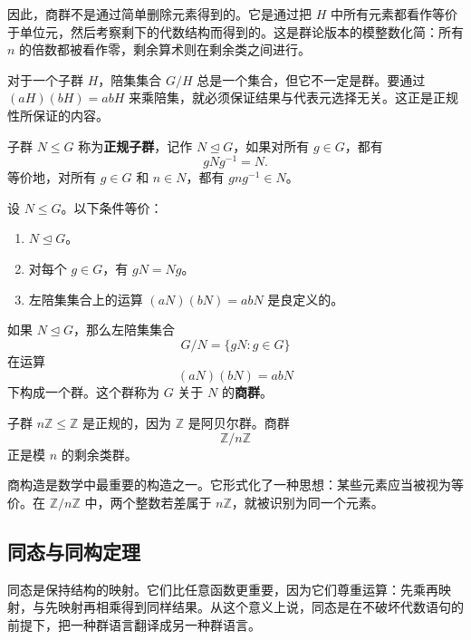 因此，商群不是通过简单删除元素得到的。它是通过把 $H$ 中所有元素都看作等价于单位元，然后考察剩下的代数结构而得到的。这是群论版本的模整数化简：所有 $n$ 的倍数都被看作零，剩余算术则在剩余类之间进行。

对于一个子群 $H$，陪集集合 $G/H$ 总是一个集合，但它不一定是群。要通过 $(aH)(bH)=abH$ 来乘陪集，就必须保证结果与代表元选择无关。这正是正规性所保证的内容。

\begin{definition}[正规子群]
子群 $N\leq G$ 称为\textbf{正规子群}，记作 $N\trianglelefteq G$，如果对所有 $g\in G$，都有
\[
    gNg^{-1}=N.
\]
等价地，对所有 $g\in G$ 和 $n\in N$，都有 $gng^{-1}\in N$。
\end{definition}

\begin{proposition}[正规性的等价形式]
设 $N\leq G$。以下条件等价：
\begin{enumerate}
    \item $N\trianglelefteq G$。
    \item 对每个 $g\in G$，有 $gN=Ng$。
    \item 左陪集集合上的运算 $(aN)(bN)=abN$ 是良定义的。
\end{enumerate}
\end{proposition}


\begin{definition}[商群]
如果 $N\trianglelefteq G$，那么左陪集集合
\[
    G/N=\{gN:g\in G\}
\]
在运算
\[
    (aN)(bN)=abN
\]
下构成一个群。这个群称为 $G$ 关于 $N$ 的\textbf{商群}。
\end{definition}

\begin{example}[模 $n$ 整数]
子群 $n\mathbb{Z}\leq\mathbb{Z}$ 是正规的，因为 $\mathbb{Z}$ 是阿贝尔群。商群
\[
    \mathbb{Z}/n\mathbb{Z}
\]
正是模 $n$ 的剩余类群。
\end{example}


\begin{remark}
商构造是数学中最重要的构造之一。它形式化了一种思想：某些元素应当被视为等价。在 $\mathbb{Z}/n\mathbb{Z}$ 中，两个整数若差属于 $n\mathbb{Z}$，就被识别为同一个元素。
\end{remark}

\subsection{同态与同构定理}


同态是保持结构的映射。它们比任意函数更重要，因为它们尊重运算：先乘再映射，与先映射再相乘得到同样结果。从这个意义上说，同态是在不破坏代数语句的前提下，把一种群语言翻译成另一种群语言。

